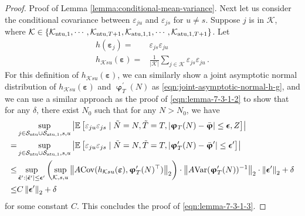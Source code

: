\begin{proof}{Proof of Lemma \ref{lemma:conditional-mean-variance}.}
Next let us consider the conditional covariance between $\varepsilon_{ju}$ and $\varepsilon_{js}$ for $u \neq s$. Suppose $j$ is in $\mathcal{K}$, where $\mathcal{K} \in \{\mathcal{K}_{\mathrm{ntu},1}, \cdots, \mathcal{K}_{\mathrm{ntu},T+1}, \mathcal{K}_{\mathrm{atu},1,1}, \cdots, \mathcal{K}_{\mathrm{atu},1,T+1}\}$. Let 
\begin{align*}
    h(\bm{\varepsilon}_j) =& \varepsilon_{js}\varepsilon_{ju} \\
    h_{\mathcal{K}su}(\bm{\varepsilon}) =& \frac{1}{|\mathcal{K}|} \sum_{j \in \mathcal{K}} \varepsilon_{js}\varepsilon_{ju} \,.
\end{align*}
For this definition of $h_{\mathcal{K}su}(\bm{\varepsilon})$, we can similarly show a joint asymptotic normal distribution of $h_{\mathcal{K}su}(\bm{\varepsilon})$ and $\bm{\upvarphi}^\prime_T(N)$ as \eqref{eqn:joint-asymptotic-normal-h-g}, and we can use a similar approach as the proof of  \eqref{eqn:lemma-7-3-1-2} to show that for any $\delta$, there exist $N_0$ such that for any $N > N_0$, we have
\begin{align*}
    & \sup_{j \in \mathcal{S}_{\mathrm{ntu}} \cup \mathcal{S}_{\mathrm{atu},1}, s,u} \left|\mathbb{E}\left[\varepsilon_{ju} \varepsilon_{js}  \mid \tilde{N} = N, \tilde{T} = T, |\bm{\upvarphi}_T(N) - \bar{\bm{\upvarphi}}| \leq {\bm{\epsilon}}, Z \right]\right| \\
    =& \sup_{j \in \mathcal{S}_{\mathrm{ntu}} \cup \mathcal{S}_{\mathrm{atu},1}, s,u} \left|\mathbb{E}\left[\varepsilon_{ju} \varepsilon_{js}  \mid \tilde{N} = N, \tilde{T} = T, |\bm{\upvarphi}^\prime_T(N) - \bar{\bm{\upvarphi}}^\prime| \leq {\bm{\epsilon}}^\prime \right]\right| \\
    \leq& \sup_{\tilde{\bm{\epsilon}}^\prime: |\tilde{\bm{\epsilon}}^\prime| \leq \bm{\epsilon}^\prime} \left(\sup_{\mathcal{K},s,u}  \left\lVert A\mathrm{Cov} (h_{\mathcal{K}su}(\bm{\varepsilon}), \bm{\upvarphi}^\prime_T(N)^\top)\right\rVert_2 \right) \cdot \left\lVert A\mathrm{Var}(\bm{\upvarphi}^\prime_T(N))^{-1}\right\rVert_2 \cdot \left\lVert\bm{\epsilon}^\prime\right\rVert_2 + {\delta}   \\
    \leq& C \left\lVert\bm{\epsilon}^\prime\right\rVert_2 + \delta 
\end{align*}
for some constant $C$. 
This concludes the proof of \eqref{eqn:lemma-7-3-1-3}. 


\end{proof}
